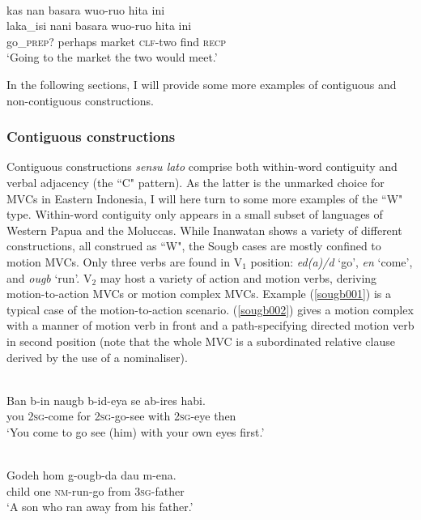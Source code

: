 \ea \label{waimaqa004}
\\
\glll kas nan basara wuo-ruo hita ini \\ 
laka\_isi nani basara wuo-ruo hita ini \\
go\_\textsc{prep?} perhaps market \textsc{clf}-two find \textsc{recp} \\
\glft `Going to the market the two would meet.'\\ 
\z

In the following sections, I will provide some more examples of contiguous and non-contiguous constructions. 

\subsubsection{Contiguous constructions}

Contiguous constructions \textit{sensu lato} comprise both within-word contiguity and verbal adjacency (the ``C" pattern). As the latter is the unmarked choice for MVCs in Eastern Indonesia, I will here turn to some more examples of the ``W" type. Within-word contiguity only appears in a small subset of languages of Western Papua and the Moluccas. While Inanwatan shows a variety of different constructions, all construed as ``W", the Sougb cases are mostly confined to motion MVCs. Only three verbs are found in V$_1$ position: \textit{ed(a)/d} `go', \textit{en} `come', and \textit{ougb} `run'. V$_2$ may host a variety of action and motion verbs, deriving motion-to-action MVCs or motion complex MVCs. Example (\ref{sougb001}) is a typical case of the motion-to-action scenario. (\ref{sougb002}) gives a motion complex with a manner of motion verb in front and a path-specifying directed motion verb in second position (note that the whole MVC is a subordinated relative clause derived by the use of a nominaliser).

\ea \label{sougb001}
\\
\gll Ban b-in naugb b-id-eya se ab-ires habi. \\
you 2\textsc{sg}-come for 2\textsc{sg}-go-see with 2\textsc{sg}-eye then \\
\glft `You come to go see (him) with your own eyes first.'\\ 
\z

\ea \label{sougb002}
\\
\gll Godeh hom g-ougb-da dau m-ena. \\
child one \textsc{nm}-run-go from 3\textsc{sg}-father \\
\glft `A son who ran away from his father.'\\ 
\z

